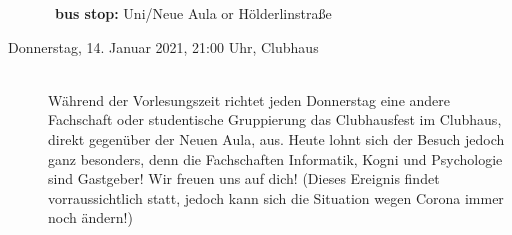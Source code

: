 \begin{description}
        ~\textbf{bus stop:} Uni/Neue Aula or Hölderlinstraße
\else
    \item[Donnerstag, 14. Januar 2021, 21:00 Uhr, Clubhaus]\ \\
        Während der Vorlesungszeit richtet jeden Donnerstag eine andere Fachschaft oder studentische Gruppierung das Clubhausfest im Clubhaus, direkt gegenüber der Neuen Aula, aus. Heute lohnt sich der Besuch jedoch ganz besonders, denn die Fachschaften Informatik, Kogni und Psychologie sind Gastgeber! Wir freuen uns auf dich! (Dieses Ereignis findet vorraussichtlich statt, jedoch kann sich die Situation wegen Corona immer noch ändern!)

\fi




\end{description}
